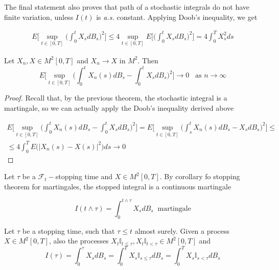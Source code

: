 The final statement also proves that path of a stochastic integrals do not have finite variation, unless $I(t)$ is \textit{a.s.} constant. Applying Doob's inequality, we get

\begin{gather*}
    E\Bigg[ \sup_{t \in [0,T]} \Bigg( \int_0^t X_s dB_s \Bigg)^2 \Bigg] \leq 4 \sup_{t \in [0,T]} E\Bigg[ \Bigg( \int_0^t X_s dB_s \Bigg)^2 \Bigg] = 4 \int_0^T X_s^2 ds
\end{gather*}

\begin{theorem}
    Let $X_n,X \in M^2[0,T]$ and $X_n \to X$ in $M^2$. Then
    \begin{equation*}
        E\Bigg[ \sup_{t \in [0,T]} \Bigg( \int_0^t X_n(s) dB_s - \int_0^t X_s dB_s \Bigg)^2 \Bigg] \to 0 \;\;\; \text{as $n\to \infty$}
    \end{equation*}
\end{theorem}
\begin{proof}
    Recall that, by the previous theorem, the stochastic integral is a martingale, so we can actually apply the Doob's inequality derived above

    \begin{gather*}
        E\Bigg[ \sup_{t \in [0,T]} \Bigg( \int_0^t X_n(s) dB_s - \int_0^t X_s dB_s \Bigg)^2 \Bigg] = E\Bigg[ \sup_{t \in [0,T]} \Bigg( \int_s^t X_n(s) dB_s -X_s dB_s \Bigg)^2 \Bigg] \leq \\
        \leq 4 \int_0^T E\Big(\vert X_n(s) - X(s) \vert^2\Big) ds \to 0  
    \end{gather*}
\end{proof}

Let $\tau$ be a $\mathcal{F}_t-$stopping time and $X \in M^2[0,T]$. By corollary fo stopping theorem for martingales, the stopped integral is a continuous martingale

\begin{equation*}
    I(t \wedge \tau) = \int_0^{t \wedge \tau} X_s dB_s \;\; \text{martingale} 
\end{equation*}

\begin{theorem}
    Let $\tau$ be a stopping time, such that $\tau \leq t$ almost surely. Given a process $X \in M^2[0,T]$, also the processes $X_t \mathbb{I}_{t \leq \tau}, X_t \mathbb{I}_{t < \tau} \in M^2[0,T]$ and
    \begin{equation*}
        I(\tau) = \int_0^{\tau} X_s dB_s = \int_0^T X_s \mathbb{I}_{s \leq \tau} dB_s = \int_0^T X_s \mathbb{I}_{s < \tau} dB_s
    \end{equation*}
\end{theorem}

